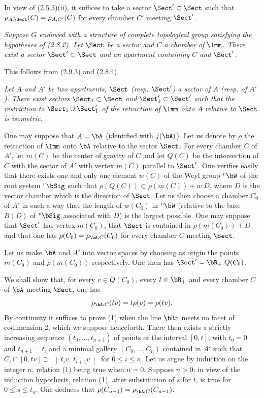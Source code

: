 \documentclass[12pt,a4paper,oneside,english]{smfart}
\makeatletter
\newcommand{\btanchor}[1]{\leavevmode\Hy@raisedlink{\hypertarget{bt:#1}{}}}
\newcommand{\btpageanchor}[1]{\Hy@raisedlink{\hypertarget{p:#1}{}}}
\newcommand{\btref}[1]{\hyperlink{bt:#1}{#1}}
\newcommand{\btpage}[1]{\marginnote{p.~#1}\btpageanchor{#1}}
\newcommand{\pagemark}[1]{\btpage{#1}}
\theoremstyle{definition}
\theoremstyle{bt}
\makeatother
\begin{document}
\medskip
In view of (\btref{2.5.3})(ii), it suffices to take a sector $\Sect'\subset\Sect$ such
that $\rho_{A;\Sect}(C)=\rho_{A;C'}(C)$ for every chamber $C'$ meeting
$\Sect'$.

\btanchor{2.9.4}
\emph{Suppose $G$ endowed with a structure of complete topological group
satisfying the hypotheses of (\btref{2.8.2}). Let $\Sect$ be a sector and $C$ a
chamber of $\Imm$. There exist a sector $\Sect'\subset\Sect$ and an apartment
containing $C$ and $\Sect'$.}

\medskip
This follows from (\btref{2.9.3}) and (\btref{2.8.4}).

\btanchor{2.9.5}
\emph{Let $A$ and $A'$ be two apartments, $\Sect$ (resp. $\Sect'$) a sector of
$A$ (resp. of $A'$). There exist sectors $\Sect_1\subset\Sect$ and
$\Sect'_1\subset\Sect'$ such that the restriction to
$\Sect_1\cup\Sect'_1$ of the retraction of $\Imm$ onto $A$ relative to
$\Sect$ is isometric.}

\medskip
One may suppose that $A=\bA$ (identified with $j(\bA)$). Let us denote by
$\rho$ the retraction of $\Imm$ onto $\bA$ relative to the sector $\Sect$. For
every chamber $C$ of $A'$, let $m(C)$ be the center of gravity of $C$ and let
$Q(C)$ be the intersection of $C$ with the sector of $A'$ with vertex $m(C)$
parallel
\pagemark{59}
to $\Sect'$. One verifies easily that there exists one and only one element
$w(C)$ of the Weyl group ${}^{v}\bW$ of the root system ${}^{v}\bSig$ such
that $\rho(Q(C))\subset\rho(m(C))+w.D$, where $D$ is the vector chamber which
is the direction of $\Sect$. Let us then choose a chamber $C_0$ of $A'$ in
such a way that the length of $w(C_0)$ in ${}^{v}\bW$ (relative to the base
$B(D)$ of ${}^{v}\bSig$ associated with $D$) is the largest possible. One may
suppose that $\Sect'$ has vertex $m(C_0)$, that $\Sect$ is contained in
$\rho(m(C_0))+D$ and that one has $\rho(C_0)=\rho_{\bA;C}(C_0)$ for every
chamber $C$ meeting $\Sect$.

Let us make $\bA$ and $A'$ into vector spaces by choosing as origin the points
$m(C_0)$ and $\rho(m(C_0))$ respectively. One then has
$\Sect'=\bR_+.Q(C_0)$.

We shall show that, for every $v\in Q(C_0)$, every $t\in\bR_+$ and every
chamber $C$ of $\bA$ meeting $\Sect$, one has
\begin{equation}
\rho_{\bA;C}(tv)=t\rho(v)=\rho(tv).
\end{equation}
By continuity it suffices to prove (1) when the line $\bR v$ meets no facet of
codimension 2, which we suppose henceforth. There then exists a strictly
increasing sequence $(t_0,\dots,t_{n+1})$ of points of the interval $[0,t]$,
with $t_0=0$ and $t_{n+1}=t$, and a minimal gallery $(C_0,\dots,C_n)$
contained in $A'$ such that
$C_i\cap[0,tv]\supset\,\left]t_iv,\,t_{i+1}v\right[$ for $0\le i\le n$. Let us
argue by induction on the integer $n$, relation (1) being true when $n=0$.
Suppose $n>0$; in view of the induction hypothesis, relation (1), after
substitution of $s$ for $t$, is true for $0\le s\le t_n$. One deduces that
$\rho(C_{n-1})=\rho_{\bA;C}(C_{n-1})$.
\end{document}
